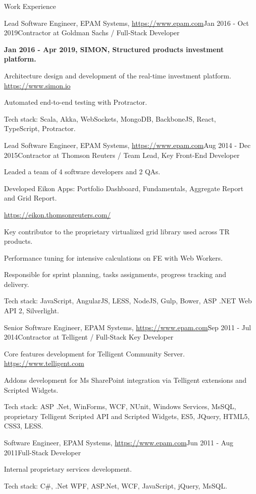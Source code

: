 \documentclass{resume}
\begin{document}
\begin{rSection}{Work Experience}
\begin{rSubsection}{Lead Software Engineer, EPAM Systems, \url{https://www.epam.com}}{Jan 2016 - Oct 2019}{Contractor at Goldman Sachs / Full-Stack Developer}{}
\item[] \textbf{Jan 2016 - Apr 2019, SIMON, Structured products investment platform.}
\item Architecture design and development of the real-time investment platform. \url{https://www.simon.io}
\item Automated end-to-end testing with Protractor.

Tech stack: Scala, Akka, WebSockets, MongoDB, BackboneJS, React, TypeScript, Protractor.
\end{rSubsection}


\begin{rSubsection}{Lead Software Engineer, EPAM Systems, \url{https://www.epam.com}}{Aug 2014 - Dec 2015}{Contractor at Thomson Reuters / Team Lead, Key Front-End Developer}{}
\item Leaded a team of 4 software developers and 2 QAs.
\item Developed Eikon Apps: Portfolio Dashboard, Fundamentals, Aggregate Report and Grid Report.
\item[] \url{https://eikon.thomsonreuters.com/}
\item Key contributor to the proprietary virtualized grid library used across TR products.
\item Performance tuning for intensive calculations on FE with Web Workers.
\item Responsible for sprint planning, tasks assignments, progress tracking and delivery.

Tech stack: JavaScript, AngularJS, LESS, NodeJS, Gulp, Bower, ASP .NET Web API 2, Silverlight.
\end{rSubsection}

\begin{rSubsection}{Senior Software Engineer, EPAM Systems, \url{https://www.epam.com}}{Sep 2011 - Jul 2014}{Contractor at Telligent / Full-Stack Key Developer}{}
\item Core features development for Telligent Community Server. \url{https://www.telligent.com}
\item Addons development for Ms SharePoint integration via Telligent extensions and Scripted Widgets.

Tech stack:  ASP .Net, WinForms, WCF, NUnit, Windows Services, MsSQL, proprietary Telligent Scripted API and Scripted Widgets, ES5, JQuery, HTML5, CSS3, LESS.
\end{rSubsection}


\begin{rSubsection}{Software Engineer, EPAM Systems, \url{https://www.epam.com}}{Jun 2011 - Aug 2011}{Full-Stack Developer}{}
\item Internal proprietary services development.

Tech stack: C\#, .Net WPF, ASP.Net, WCF, JavaScript, jQuery, MsSQL.
\end{rSubsection}

\end{rSection}
\end{document}
